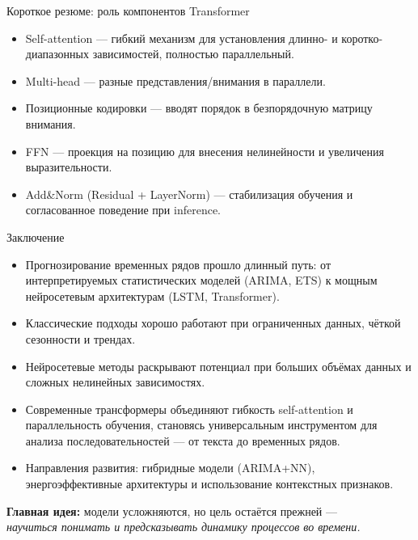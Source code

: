 \documentclass[aspectratio=1610,12pt]{beamer}
\begin{document}
\begin{frame}{Короткое резюме: роль компонентов Transformer}
\begin{itemize}
  \item Self-attention — гибкий механизм для установления длинно- и коротко- диапазонных зависимостей, полностью параллельный.
  \item Multi-head — разные представления/внимания в параллели.
  \item Позиционные кодировки — вводят порядок в безпорядочную матрицу внимания.
  \item FFN — проекция на позицию для внесения нелинейности и увеличения выразительности.
  \item Add\&Norm (Residual + LayerNorm) — стабилизация обучения и согласованное поведение при inference.
\end{itemize}
\end{frame}

\begin{frame}{Заключение}
\begin{itemize}
    \item Прогнозирование временных рядов прошло длинный путь:
    от интерпретируемых статистических моделей (ARIMA, ETS)
    к мощным нейросетевым архитектурам (LSTM, Transformer).
    \item Классические подходы хорошо работают при ограниченных данных,
    чёткой сезонности и трендах.
    \item Нейросетевые методы раскрывают потенциал при больших объёмах данных
    и сложных нелинейных зависимостях.
    \item Современные трансформеры объединяют гибкость self-attention
    и параллельность обучения, становясь универсальным инструментом
    для анализа последовательностей — от текста до временных рядов.
    \item Направления развития: гибридные модели (ARIMA+NN),
    энергоэффективные архитектуры и использование контекстных признаков.
\end{itemize}
\vspace{0.6em}
\centering
\textbf{Главная идея:} модели усложняются, но цель остаётся прежней —\\
\textit{научиться понимать и предсказывать динамику процессов во времени.}
\end{frame}
\end{document}
